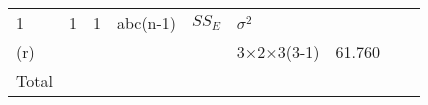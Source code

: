 \documentclass[12pt,]{article}
\begin{document}
\begin{longtable}[]{@{}lllllllll@{}}
\begin{minipage}[t]{0.03\columnwidth}
1\strut
\end{minipage} & \begin{minipage}[t]{0.03\columnwidth}\raggedright
1\strut
\end{minipage} & \begin{minipage}[t]{0.03\columnwidth}\raggedright
1\strut
\end{minipage} & \begin{minipage}[t]{0.12\columnwidth}\raggedright
abc(n-1)\strut
\end{minipage} & \begin{minipage}[t]{0.15\columnwidth}\raggedright
\(SS_{E}\)\strut
\end{minipage} & \begin{minipage}[t]{0.21\columnwidth}\raggedright
\(\sigma^2\)\strut
\end{minipage} & \begin{minipage}[t]{0.09\columnwidth}\raggedright
\strut
\end{minipage}\tabularnewline
\begin{minipage}[t]{0.06\columnwidth}\raggedright
(r)\strut
\end{minipage} & \begin{minipage}[t]{0.03\columnwidth}\raggedright
\strut
\end{minipage} & \begin{minipage}[t]{0.03\columnwidth}\raggedright
\strut
\end{minipage} & \begin{minipage}[t]{0.03\columnwidth}\raggedright
\strut
\end{minipage} & \begin{minipage}[t]{0.03\columnwidth}\raggedright
\strut
\end{minipage} & \begin{minipage}[t]{0.12\columnwidth}\raggedright
3×2×3(3-1)\strut
\end{minipage} & \begin{minipage}[t]{0.15\columnwidth}\raggedright
61.760\strut
\end{minipage} & \begin{minipage}[t]{0.21\columnwidth}\raggedright
\strut
\end{minipage} & \begin{minipage}[t]{0.09\columnwidth}\raggedright
\strut
\end{minipage}\tabularnewline
\begin{minipage}[t]{0.06\columnwidth}\raggedright
Total\strut
\end{minipage} & \begin{minipage}[t]{0.03\columnwidth}\raggedright

\end{minipage}
\end{longtable}
\end{document}
